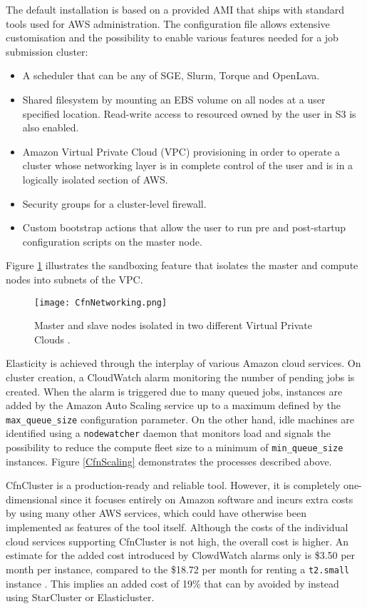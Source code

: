 The default installation is based on a provided AMI that ships with standard tools used for AWS administration. The configuration file allows extensive customisation and the possibility to enable various features needed for a job submission cluster:
\begin{itemize}
	\item A scheduler that can be any of SGE, Slurm, Torque and OpenLava\cite{OpenLava}.
	\item Shared filesystem by mounting an EBS volume on all nodes at a user specified location. Read-write access to resourced owned by the user in S3 is also enabled.
	\item Amazon Virtual Private Cloud (VPC) provisioning in order to operate a cluster whose networking layer is in complete control of the user and is in a logically isolated section of AWS.
	\item Security groups for a cluster-level firewall.
	\item Custom bootstrap actions that allow the user to run pre and post-startup configuration scripts on the master node.
\end{itemize}

Figure \ref{CfnNetworking} illustrates the sandboxing feature that isolates the master and compute nodes into subnets of the VPC.

\begin{figure}[h]
	\centering
		\texttt{[image: CfnNetworking.png]}
	\caption{Master and slave nodes isolated in two different Virtual Private Clouds \cite{CfnVPC}.}
	\label{CfnNetworking}
\end{figure}

Elasticity is achieved through the interplay of various Amazon cloud services. On cluster creation, a CloudWatch alarm monitoring the number of pending jobs is created. When the alarm is triggered due to many queued jobs, instances are added by the Amazon Auto Scaling service up to a maximum defined by the \verb|max_queue_size| configuration parameter. On the other hand, idle machines are identified using a \verb|nodewatcher| daemon that monitors load and signals the possibility to reduce the compute fleet size to a minimum of \verb|min_queue_size| instances. Figure \ref{CfnScaling} demonstrates the processes described above.

CfnCluster is a production-ready and reliable tool. However, it is completely one-dimensional since it focuses entirely on Amazon software and incurs extra costs by using many other AWS services, which could have otherwise been implemented as features of the tool itself. Although the costs of the individual cloud services supporting CfnCluster is not high, the overall cost is higher. An estimate for the added cost introduced by ClowdWatch alarms only is \$3.50 per month per instance, compared to the \$18.72 per month for renting a \verb|t2.small| instance \cite{AWSPricing}. This implies an added cost of 19\% that can by avoided by instead using StarCluster or Elasticluster.

